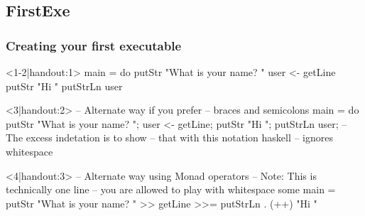 \subsection{FirstExe}
\begin{frame}[t,fragile]
    \frametitle{Creating your first executable}
    \begin{overprint}
        \begin{hscode}<1-2|handout:1>
            main = do
              putStr "What is your name? "
              user <- getLine
              putStr "Hi "
              putStrLn user
        \end{hscode}

        \begin{onlyenv}<2|handout:1>
            To Run: \\
            \begin{verbatim}runhaskell <yourfile>\end{verbatim}}
            Or: \\
            \begin{verbatim}ghc <yourfile> -o <exename>; ./<exename>\end{verbatim}
        \end{onlyenv}

        \begin{hscode}<3|handout:2>
            -- Alternate way if you prefer 
            --   braces and semicolons
            main = do {
              putStr "What is your name? ";
                user <- getLine;
                  putStr "Hi ";
                    putStrLn user;
            }
            -- The excess indetation is to show
            --   that with this notation haskell
            --   ignores whitespace
        \end{hscode}

        \begin{hscode}<4|handout:3>
            -- Alternate way using Monad operators
            -- Note: This is technically one line
            --   you are allowed to play with whitespace some
            main = putStr "What is your name? " >>
                   getLine >>=
                   putStrLn . (++) "Hi "
        \end{hscode}
    \end{overprint}
\end{frame}

